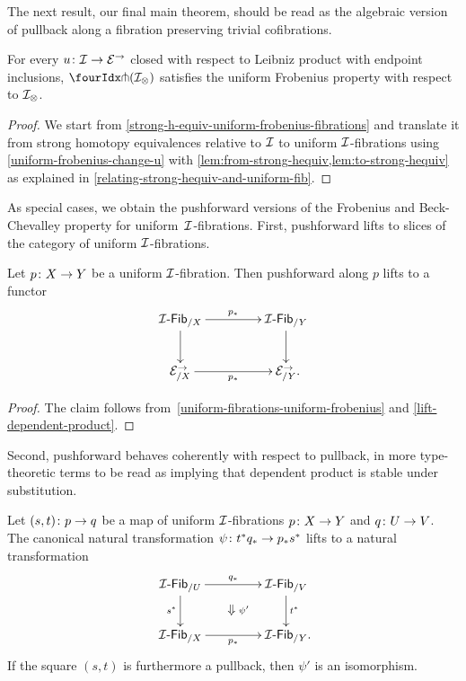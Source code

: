 \documentclass[reqno,10pt,a4paper,oneside,draft]{amsart}
\begin{document}
The next result, our final main theorem, should be read as the algebraic version of pullback along a fibration preserving trivial cofibrations.

\begin{theorem} \label{uniform-fibrations-uniform-frobenius}
For every $u \co \cal{I} \to \catE^\to$  closed with respect to Leibniz product with endpoint inclusions,  $\liftr{(\cal{I}_{\otimes})}$ satisfies the uniform Frobenius property with respect to $\cal{I}_{\otimes}$.
\end{theorem}

\begin{proof}
We start from \cref{strong-h-equiv-uniform-frobenius-fibrations} and translate it from strong homotopy equivalences relative to $\cal{I}$ to uniform $\cal{I}$-fibrations using \cref{uniform-frobenius-change-u} with \cref{lem:from-strong-hequiv,lem:to-strong-hequiv} as explained in \cref{relating-strong-hequiv-and-uniform-fib}.
\end{proof}

As special cases, we obtain the pushforward versions of the Frobenius and Beck-Chevalley property for uniform~$\cal{I}$-fibrations.
First, pushforward lifts to slices of the category of uniform $\cal{I}$-fibrations.

\begin{corollary} \label{uniform-fibrations-frobenius-pushforward}
Let $p \co X \to Y$ be a uniform $\cal{I}$-fibration.
Then pushforward along $p$ lifts to a functor
\[
\xymatrix@C+2em{
  \Fib[\cal{I}]_{/X}
  \ar[r]^{p_*}
  \ar[d]
&
  \Fib[\cal{I}]_{/Y}
  \ar[d]
\\
  \catE_{/X}^\to
  \ar[r]_{p_*}
&
  \catE_{/Y}^\to
\rlap{.}}
\]
\end{corollary}

\begin{proof}
The claim follows from~\cref{uniform-fibrations-uniform-frobenius} and \cref{lift-dependent-product}.
\end{proof}

Second, pushforward behaves coherently with respect to pullback, in more type-theoretic terms to be read as implying that dependent product is stable under substitution.

\begin{corollary} \label{uniform-fibrations-BC-pushforward}
Let $(s, t) \co p \to q$ be a map of uniform $\cal{I}$-fibrations $p \co X \to Y$ and $q \co U \to V$.
The canonical natural transformation $\psi \co t^* q_* \to p_* s^*$ lifts to a natural transformation
\[
\xymatrix@C+2em{
  \Fib[\cal{I}]_{/U}
  \ar[r]^{q_*}
  \ar[d]_{s^*}
  \ar@{}[dr]|{\textstyle\Downarrow \rlap{$\labelstyle \psi'$}}
&
  \Fib[\cal{I}]_{/V}
  \ar[d]^{t^*}
\\
  \Fib[\cal{I}]_{/X}
  \ar[r]_{p_*}
&
  \Fib[\cal{I}]_{/Y}
\rlap{.}}
\]
If the square $(s, t)$ is furthermore a pullback, then $\psi'$ is an isomorphism.
\end{corollary}
\end{document}

